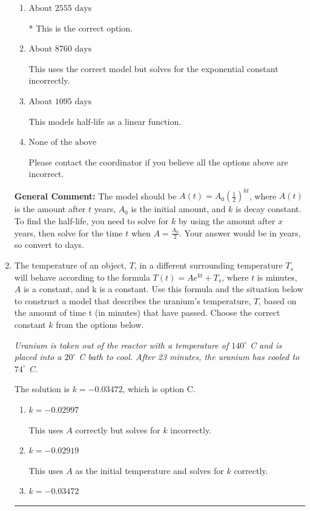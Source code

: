 \documentclass{extbook}[14pt]
\newcommand{\litem}[1]{\item #1

\rule{\textwidth}{0.4pt}}
\begin{document}
\begin{enumerate}
{\begin{enumerate}[label=\Alph*.]
This uses the correct model but a base of $e$ rather than $\frac{1}{2}$.
\item \( \text{About } 2555 \text{ days} \)

* This is the correct option.
\item \( \text{About } 8760 \text{ days} \)

This uses the correct model but solves for the exponential constant incorrectly.
\item \( \text{About } 1095 \text{ days} \)

This models half-life as a linear function.
\item \( \text{None of the above} \)

Please contact the coordinator if you believe all the options above are incorrect.
\end{enumerate}

\textbf{General Comment:} The model should be $A(t) = A_0 (\frac{1}{2})^{kt}$, where $A(t)$ is the amount after $t$ years, $A_0$ is the initial amount, and $k$ is decay constant. To find the half-life, you need to solve for $k$ by using the amount after $x$ years, then solve for the time $t$ when $A = \frac{A_0}{2}$. Your answer would be in years, so convert to days.
}
\litem{
The temperature of an object, $T$, in a different surrounding temperature $T_s$ will behave according to the formula $T(t) = Ae^{kt} + T_s$, where $t$ is minutes, $A$ is a constant, and k is a constant. Use this formula and the situation below to construct a model that describes the uranium's temperature, $T$, based on the amount of time t (in minutes) that have passed. Choose the correct constant $k$ from the options below.

\begin{center}
    \textit{ Uranium is taken out of the reactor with a temperature of $140^{\circ}$ C and is placed into a $20^{\circ}$ C bath to cool. After 23 minutes, the uranium has cooled to $74^{\circ}$ C. }
\end{center}


The solution is \( k = -0.03472 \), which is option C.\begin{enumerate}[label=\Alph*.]
\item \( k = -0.02997 \)

This uses $A$ correctly but solves for $k$ incorrectly.
\item \( k = -0.02919 \)

This uses $A$ as the initial temperature and solves for $k$ correctly.
\item \( k = -0.03472 \)


\end{enumerate}}
\end{enumerate}
\end{document}
